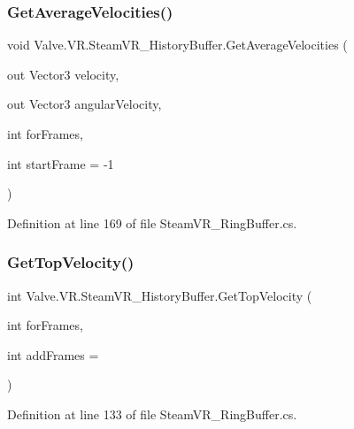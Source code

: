 \subsubsection{\texorpdfstring{GetAverageVelocities()}{GetAverageVelocities()}}
{\footnotesize\ttfamily void Valve.\+V\+R.\+Steam\+V\+R\+\_\+\+History\+Buffer.\+Get\+Average\+Velocities (\begin{DoxyParamCaption}\item[{out Vector3}]{velocity,  }\item[{out Vector3}]{angular\+Velocity,  }\item[{int}]{for\+Frames,  }\item[{int}]{start\+Frame = {\ttfamily -\/1} }\end{DoxyParamCaption})}



Definition at line 169 of file Steam\+V\+R\+\_\+\+Ring\+Buffer.\+cs.

\mbox{\label{class_valve_1_1_v_r_1_1_steam_v_r___history_buffer_a8bc2699617e344d5852d707bb36547f0}} 
\subsubsection{\texorpdfstring{GetTopVelocity()}{GetTopVelocity()}}
{\footnotesize\ttfamily int Valve.\+V\+R.\+Steam\+V\+R\+\_\+\+History\+Buffer.\+Get\+Top\+Velocity (\begin{DoxyParamCaption}\item[{int}]{for\+Frames,  }\item[{int}]{add\+Frames = {} }\end{DoxyParamCaption})}



Definition at line 133 of file Steam\+V\+R\+\_\+\+Ring\+Buffer.\+cs.

\mbox{\label{class_valve_1_1_v_r_1_1_steam_v_r___history_buffer_a87dbc0840edd30d82bb5dc7e33b4b84c}} 
